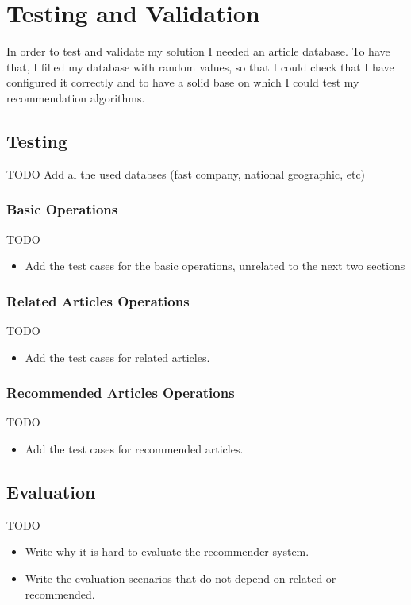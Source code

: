\chapter{Testing and Validation}
\label{chapter:testing-validation}

In order to test and validate my solution I needed an article database. To have that, I filled my database with random values, so that I could check that I have configured it correctly and to have a solid base on which I could test my recommendation algorithms.

\section{Testing} 
\label{sec:testing}
TODO Add al the used databses (fast company, national geographic, etc)
\subsection{Basic Operations} 
\label{sec:basic-operations}
TODO
\begin{itemize}
	\item Add the test cases for the basic operations, unrelated to the next two sections
\end{itemize}

\subsection{Related Articles Operations} 
\label{sec:related-articles-operations}
TODO
\begin{itemize}
	\item Add the test cases for related articles.
\end{itemize}

\subsection{Recommended Articles Operations} 
\label{sec:recommended-articles-operations}
TODO
\begin{itemize}
	\item Add the test cases for recommended articles.
\end{itemize}

\section{Evaluation} 
\label{sec:evaluation}
TODO
\begin{itemize}
	\item Write why it is hard to evaluate the recommender system.
	\item Write the evaluation scenarios that do not depend on related or recommended.
\end{itemize}

